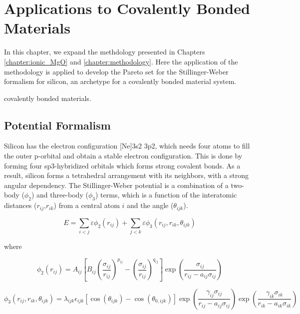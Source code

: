 \chapter{Applications to Covalently Bonded Materials}\label{chapter:pareto_Si}

In this chapter, we expand the methdology presented in Chapters \ref{chapter:ionic_MgO} and \ref{chapter:methodology}.  Here the application of the methodology is applied to develop the Pareto set for the Stillinger-Weber formalism\cite{stillinger1985_sw} for silicon, an archetype for a covalently bonded material system.

 covalently bonded materials.
\section{Potential Formalism}
Silicon has the electron configuration [Ne]3s2 3p2, which needs four atoms to fill the outer p-orbital and obtain a stable electron configuration.  This is done by forming four sp3-hybridized orbitals which forms strong covalent bonds.  As a result, silicon forms a tetrahedral arrangement with its neighbors, with a strong angular dependency.  The Stillinger-Weber potential\cite{stillinger1985_sw} is a combination of a two-body ($\phi_2$) and three-body ($\phi_3$) terms, which is a function of the interatomic distances ($r_{ij}$,$r_{ik}$) from a central atom $i$ and the angle ($\theta_{ijk}$).

\begin{equation}
    E = \sum_{i<j}\varepsilon \phi_2 (r_{ij})
        +\sum_{j<k}\varepsilon \phi_3 (r_{ij},r_{ik},\theta_{ijk})
\end{equation}

where

\begin{equation}
    \phi_2(r_{ij})=A_{ij} \left[
        B_{ij}
        \left(\frac{\sigma_{ij}}{r_{ij}}\right)^{p_{ij}}
        - \left(\frac{\sigma_{ij}}{r_{ij}}\right)^{q_{ij}}
    \right]
    \exp\left(\frac{\sigma_{ij}}{r_{ij}-a_{ij}\sigma_{ij}}\right)
\end{equation}

\begin{equation}
    \phi_3(r_{ij},r_{ik},\theta_{ijk}) =
        \lambda_{ijk}
        \epsilon_{ijk}
        \left[
            \cos(\theta_{ijk}) - \cos(\theta_{0,ijk})
        \right]
        \exp\left(\frac{\gamma_{ij}\sigma_{ij}}
                       {r_{ij}-a_{ij}\sigma_{ij}}
            \right)
        \exp\left(\frac{\gamma_{ik}\sigma_{ik}}
                       {r_{ik}-a_{ik}\sigma_{ik}}
            \right)
\end{equation}

